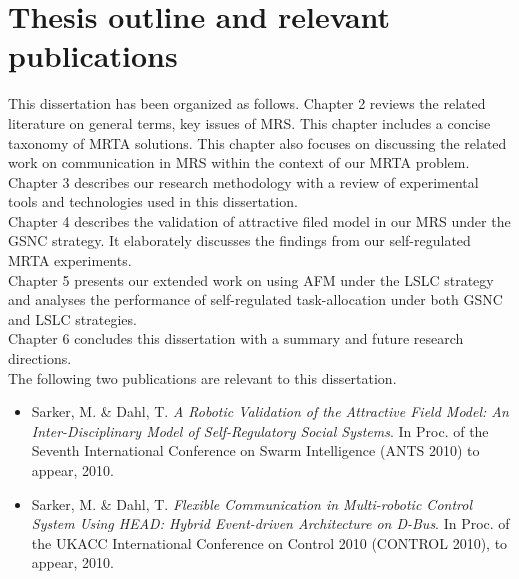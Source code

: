 \section{Thesis outline and relevant publications}
This dissertation has been organized as follows.
Chapter 2  reviews the related literature on general terms, key issues of MRS. This chapter includes a concise taxonomy of MRTA solutions. This chapter also focuses on discussing the related work on communication in MRS within the context of our MRTA problem.\\
Chapter 3 describes our research methodology with a review of experimental tools and technologies used in this dissertation.\\
Chapter 4 describes the validation of attractive filed model in our MRS under the GSNC strategy. It elaborately discusses the findings from our self-regulated MRTA experiments.\\
Chapter 5 presents our extended work on using AFM under the LSLC strategy and analyses the  performance of self-regulated task-allocation under both GSNC and LSLC strategies.\\
Chapter 6 concludes this dissertation  with a summary and future research directions.\\
The following two publications are relevant to this dissertation.
\begin{itemize}
\item Sarker, M. \& Dahl, T.\textit{ A Robotic Validation of the Attractive Field Model: An Inter-Disciplinary Model of Self-Regulatory Social Systems}. In Proc. of the Seventh International Conference on Swarm Intelligence (ANTS 2010) to appear, 2010.
\item Sarker, M. \& Dahl, T. \textit{Flexible Communication in Multi-robotic Control System Using HEAD: Hybrid Event-driven Architecture on D-Bus}. In Proc. of the UKACC International Conference on Control 2010 (CONTROL 2010), to appear, 2010.
\end{itemize}